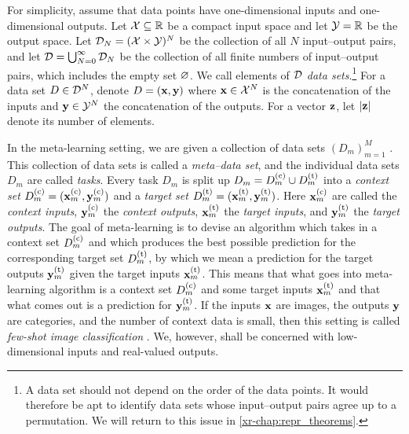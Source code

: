 \documentclass[12pt, twoside]{report}
\newcommand{\xrprefix}[1]{xr-#1}
\begin{document}
For simplicity, assume that data points have one-dimensional inputs and one-dimensional outputs.
Let $\mathcal{X} \subseteq \mathbb{R}$ be a compact input space and let $\mathcal{Y} = \mathbb{R}$ be the output space.
Let $\mathcal{D}_N = (\mathcal{X} \times \mathcal{Y})^N$ be the collection of all $N$ input--output pairs, and let $\mathcal{D} = \bigcup_{N=0}^\infty \mathcal{D}_N$ be the collection of all finite numbers of input--output pairs, which includes the empty set $\varnothing$.
We call elements of $\mathcal{D}$ \emph{data sets}.\footnote{
    A data set should not depend on the order of the data points.
    It would therefore be apt to identify data sets whose input--output pairs agree up to a permutation.
    We will return to this issue in \cref{\xrprefix{chap:repr_theorems}}.
}
For a data set $D \in \mathcal{D}^N$,
denote $D = (\mathbf{x}, \mathbf{y})$ where $\mathbf{x} \in \mathcal{X}^N$ is the concatenation of the inputs and $\mathbf{y} \in \mathcal{Y}^N$ the concatenation of the outputs.
For a vector $\mathbf{z}$, let $\lvert\mathbf{z}\rvert$ denote its number of elements.

In the meta-learning setting, we are given a collection of data sets $(D_m)_{m=1}^M$ \parencite{Vinyals:2016:Matching_Networks_for_One_Shot,Ravi:2017:Optimization_as_a_Model_for}.
This collection of data sets is called a \emph{meta--data set}, and the individual data sets $D_m$ are called \emph{tasks}.
Every task $D_m$ is split up $D_m = D_m\us{(c)} \cup D_m\us{(t)}$ into a
\emph{context set} $D_m\us{(c)} = (\vx_m\us{(c)}, \vy_m\us{(c)})$ and a \emph{target set} $D_m\us{(t)} = (\vx_m\us{(t)}, \vy_m\us{(t)})$. 
Here $\vx\us{(c)}_m$ are called the \emph{context inputs},
$\vy\us{(c)}_m$ the \emph{context outputs},
$\vx\us{(t)}_m$ the \emph{target inputs}, and
$\vy\us{(t)}_m$ the \emph{target outputs}.
The goal of meta-learning is to devise an algorithm which takes in a context set $D_m\us{(c)}$ and which produces the best possible prediction for the corresponding target set $D_m\us{(t)}$, by which we mean a prediction for the target outputs $\vy\us{(t)}_m$ given the target inputs $\vx\us{(t)}_m$.
This means that what goes into meta-learning algorithm is a context set $D_m\us{(c)}$ and some target inputs $\vx\us{(t)}_m$ and that what comes out is a prediction for $\vy\us{(t)}_m$.
If the inputs $\mathbf{x}$ are images, the outputs $\mathbf{y}$ are categories, and the number of context data is small, then this setting is called \emph{few-shot image classification} \parencite{Fei-Fei:2006:One-Shot_Learning_of_Object_Categories,Lake:2015:Human-Level_Concept_Learning_Through_Probabilistic}.
We, however, shall be concerned with low-dimensional inputs and real-valued outputs.
\end{document}
